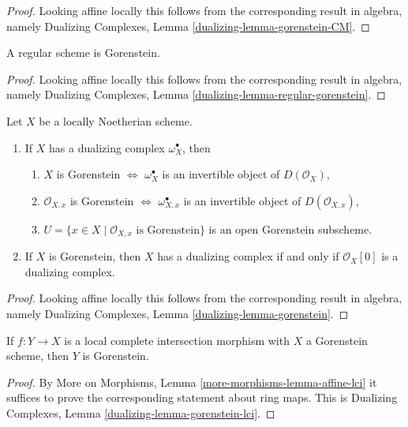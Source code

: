 \begin{proof}
Looking affine locally this follows from the corresponding
result in algebra, namely
Dualizing Complexes, Lemma \ref{dualizing-lemma-gorenstein-CM}.
\end{proof}

\begin{lemma}
\label{lemma-regular-gorenstein}
A regular scheme is Gorenstein.
\end{lemma}

\begin{proof}
Looking affine locally this follows from the corresponding
result in algebra, namely
Dualizing Complexes, Lemma \ref{dualizing-lemma-regular-gorenstein}.
\end{proof}

\begin{lemma}
\label{lemma-gorenstein}
Let $X$ be a locally Noetherian scheme.
\begin{enumerate}
\item If $X$ has a dualizing complex $\omega_X^\bullet$, then
\begin{enumerate}
\item $X$ is Gorenstein $\Leftrightarrow$ $\omega_X^\bullet$ is an invertible
object of $D(\mathcal{O}_X)$,
\item $\mathcal{O}_{X, x}$ is Gorenstein $\Leftrightarrow$
$\omega_{X, x}^\bullet$ is an invertible object of $D(\mathcal{O}_{X, x})$,
\item $U = \{x \in X \mid \mathcal{O}_{X, x}\text{ is Gorenstein}\}$
is an open Gorenstein subscheme.
\end{enumerate}
\item If $X$ is Gorenstein, then $X$ has a dualizing complex if and
only if $\mathcal{O}_X[0]$ is a dualizing complex.
\end{enumerate}
\end{lemma}

\begin{proof}
Looking affine locally this follows from the corresponding
result in algebra, namely
Dualizing Complexes, Lemma \ref{dualizing-lemma-gorenstein}.
\end{proof}

\begin{lemma}
\label{lemma-gorenstein-lci}
If $f : Y \to X$ is a local complete intersection morphism
with $X$ a Gorenstein scheme, then $Y$ is Gorenstein.
\end{lemma}

\begin{proof}
By More on Morphisms, Lemma \ref{more-morphisms-lemma-affine-lci}
it suffices to prove the corresponding statement about ring maps.
This is Dualizing Complexes, Lemma \ref{dualizing-lemma-gorenstein-lci}.
\end{proof}

